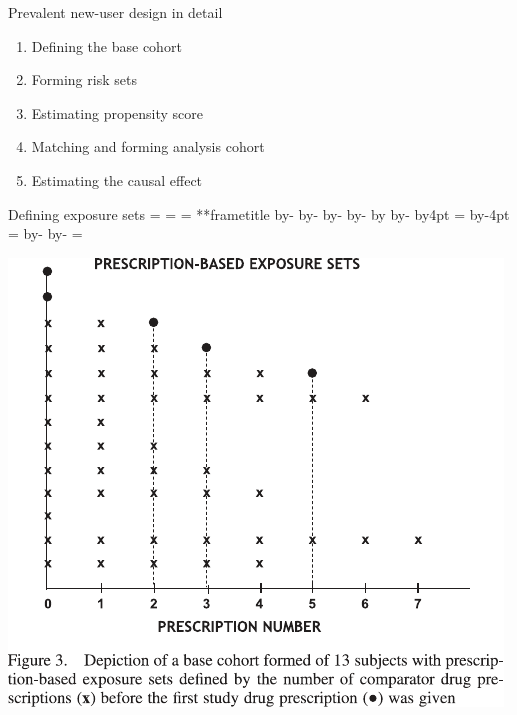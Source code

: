 \documentclass[aspectratio=169,12pt]{beamer} %
\makeatletter
\newif\ifsidebartheme
\newcommand*{\calculatespace}{%
    \contentheight=\paperheight%
    \ifx\beamer@frametitle\@empty%
        \setbox\@tempboxa=\box\voidb@x%
      \else%
        \setbox\@tempboxa=\vbox{%
          \vbox{}%
          {\parskip0pt\usebeamertemplate***{frametitle}}%
        }%
        \ifsidebartheme%
          \advance\contentheight by-1em%
        \fi%
      \fi%
    \advance\contentheight by-\ht\@tempboxa%
    \advance\contentheight by-\dp\@tempboxa%
    \advance\contentheight by-\beamer@frametopskip%
    \ifbeamer@plainframe%
    \contentbottom=0pt%
    \else%
    \advance\contentheight by-\headheight%
    \advance\contentheight by\headdp%
    \advance\contentheight by-\footheight%
    \advance\contentheight by4pt%
    \contentbottom=\footheight%
    \advance\contentbottom by-4pt%
    \fi%
    \contentwidth=\paperwidth%
    \ifbeamer@plainframe%
    \contentleft=0pt%
    \else%
    \advance\contentwidth by-\beamer@rightsidebar%
    \advance\contentwidth by-\beamer@leftsidebar\relax%
    \contentleft=\beamer@leftsidebar%
    \fi%
}
\makeatother
\begin{document}
\begin{frame}{Prevalent new-user design in detail}
    \begin{enumerate}
	\item Defining the base cohort
	\item Forming risk sets
	\item Estimating propensity score
	\item Matching and forming analysis cohort
	\item Estimating the causal effect
    \end{enumerate}
\end{frame}

\begin{frame}{Defining exposure sets}
    \calculatespace%
    \begin{center}
	\includegraphics[height=0.85\contentheight]{ref/suimoodell-fig3.pdf}
    \end{center}

\end{frame}
\end{document}
